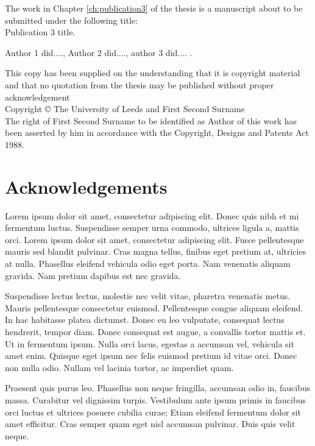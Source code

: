 \documentclass[titlepage,twoside,onecolumn,a4paper,11pt]{report}
\begin{document}
The work in Chapter \ref{ch:publication3} of the thesis is a manuscript about to be submitted under the following title:\\
Publication 3 title.

Author 1 did...., Author 2 did...., author 3 did.... .
\vspace{5mm}

This copy has been supplied on the understanding that it is copyright material and that no quotation from the thesis may be published without proper acknowledgement\\

Copyright \copyright{} The University of Leeds and First Second Surname\\
The right of First Second Surname to be identified as Author of this work has been asserted by him in accordance with the Copyright, Designs and Patents Act 1988.
\cleardoublepage




\chapter*{Acknowledgements}
\fancyhead[RO,LE]{\thepage}

Lorem ipsum dolor sit amet, consectetur adipiscing elit. Donec quis nibh et mi fermentum luctus. Suspendisse semper urna commodo, ultrices ligula a, mattis orci. Lorem ipsum dolor sit amet, consectetur adipiscing elit. Fusce pellentesque mauris sed blandit pulvinar. Cras magna tellus, finibus eget pretium at, ultricies at nulla. Phasellus eleifend vehicula odio eget porta. Nam venenatis aliquam gravida. Nam pretium dapibus est nec gravida.

Suspendisse lectus lectus, molestie nec velit vitae, pharetra venenatis metus. Mauris pellentesque consectetur euismod. Pellentesque congue aliquam eleifend. In hac habitasse platea dictumst. Donec eu leo vulputate, consequat lectus hendrerit, tempor diam. Donec consequat est augue, a convallis tortor mattis et. Ut in fermentum ipsum. Nulla orci lacus, egestas a accumsan vel, vehicula sit amet enim. Quisque eget ipsum nec felis euismod pretium id vitae orci. Donec non nulla odio. Nullam vel lacinia tortor, ac imperdiet quam.

Praesent quis purus leo. Phasellus non neque fringilla, accumsan odio in, faucibus massa. Curabitur vel dignissim turpis. Vestibulum ante ipsum primis in faucibus orci luctus et ultrices posuere cubilia curae; Etiam eleifend fermentum dolor sit amet efficitur. Cras semper quam eget nisl accumsan pulvinar. Duis quis velit neque.
\end{document}
